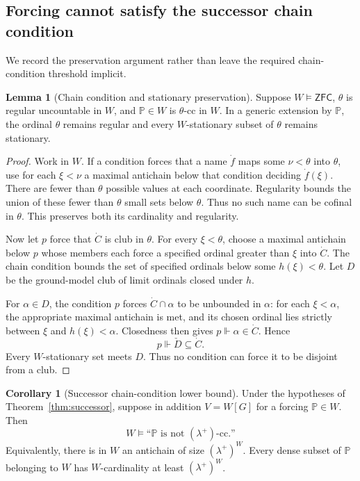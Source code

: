 \documentclass[11pt,letterpaper]{article}
\theoremstyle{definition}
\newtheorem{lemma}[definition]{Lemma}
\newtheorem{corollary}[definition]{Corollary}
\numberwithin{equation}{section}
\newcommand{\ZFC}{\mathsf{ZFC}}
\newcommand{\PP}{\mathbb P}
\newcommand{\cc}{\text{-cc}}
\begin{document}
\subsection{Forcing cannot satisfy the successor chain condition}

We record the preservation argument rather than leave the required chain-condition threshold implicit.

\begin{lemma}[Chain condition and stationary preservation]\label{lem:cc-preserves}
Suppose $W\models\ZFC$, $\theta$ is regular uncountable in $W$, and $\PP\in W$ is $\theta\cc$ in $W$. In a generic extension by $\PP$, the ordinal $\theta$ remains regular and every $W$-stationary subset of $\theta$ remains stationary.
\end{lemma}

\begin{proof}
Work in $W$. If a condition forces that a name $\dot f$ maps some $\nu<\theta$ into $\theta$, use for each $\xi<\nu$ a maximal antichain below that condition deciding $\dot f(\xi)$. There are fewer than $\theta$ possible values at each coordinate. Regularity bounds the union of these fewer than $\theta$ small sets below $\theta$. Thus no such name can be cofinal in $\theta$. This preserves both its cardinality and regularity.

Now let $p$ force that $\dot C$ is club in $\theta$. For every $\xi<\theta$, choose a maximal antichain below $p$ whose members each force a specified ordinal greater than $\xi$ into $\dot C$. The chain condition bounds the set of specified ordinals below some $h(\xi)<\theta$. Let $D$ be the ground-model club of limit ordinals closed under $h$.

For $\alpha\in D$, the condition $p$ forces $\dot C\cap\alpha$ to be unbounded in $\alpha$: for each $\xi<\alpha$, the appropriate maximal antichain is met, and its chosen ordinal lies strictly between $\xi$ and $h(\xi)<\alpha$. Closedness then gives $p\Vdash\alpha\in\dot C$. Hence
\[
p\Vdash\check D\subseteq\dot C.
\]
Every $W$-stationary set meets $D$. Thus no condition can force it to be disjoint from a club.
\end{proof}

\begin{corollary}[Successor chain-condition lower bound]\label{cor:abstract-forcing}
Under the hypotheses of Theorem~\ref{thm:successor}, suppose in addition $V=W[G]$ for a forcing $\PP\in W$. Then
\[
W\models\text{``$\PP$ is not $(\lambda^+)\cc$.''}
\]
Equivalently, there is in $W$ an antichain of size $(\lambda^+)^W$. Every dense subset of $\PP$ belonging to $W$ has $W$-cardinality at least $(\lambda^+)^W$.
\end{corollary}
\end{document}
